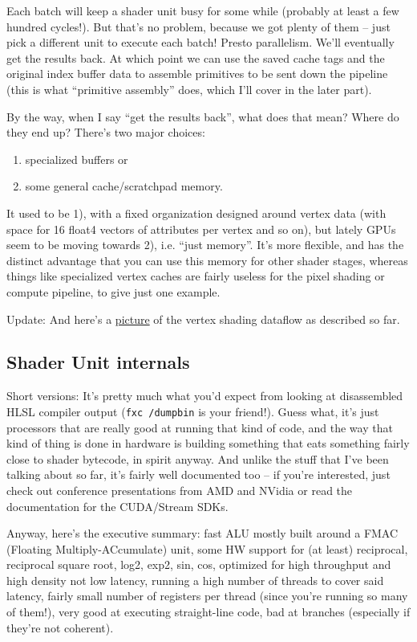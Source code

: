 \documentclass[12pt]{article}
\begin{document}
Each batch will keep a shader unit busy for some while (probably at least a few hundred cycles!).
But that’s no problem, because we got plenty of them – just pick a different unit to execute each batch! Presto parallelism.
We’ll eventually get the results back.
At which point we can use the saved cache tags and the original index buffer data to assemble primitives to be sent down the pipeline (this is what “primitive assembly” does, which I’ll cover in the later part).

By the way, when I say “get the results back”, what does that mean? Where do they end up? There’s two major choices:

\begin{enumerate}
\item specialized buffers or
\item some general cache/scratchpad memory.
\end{enumerate}

It used to be 1), with a fixed organization designed around vertex data (with space for 16 float4 vectors of attributes per vertex and so on), but lately GPUs seem to be moving towards 2), i.e. “just memory”.
It’s more flexible, and has the distinct advantage that you can use this memory for other shader stages, whereas things like specialized vertex caches are fairly useless for the pixel shading or compute pipeline, to give just one example.

Update: And here’s a \href{http://www.farbrausch.de/\~fg/gpu/vertex\_shade.jpg}{picture} of the vertex shading dataflow as described so far.

\subsection{Shader Unit internals}
\label{sec:orgef1e7af}

Short versions: It’s pretty much what you’d expect from looking at disassembled HLSL compiler output (\texttt{fxc /dumpbin} is your friend!).
Guess what, it’s just processors that are really good at running that kind of code, and the way that kind of thing is done in hardware is building something that eats something fairly close to shader bytecode, in spirit anyway.
And unlike the stuff that I’ve been talking about so far, it’s fairly well documented too – if you’re interested, just check out conference presentations from AMD and NVidia or read the documentation for the CUDA/Stream SDKs.

Anyway, here’s the executive summary: fast ALU mostly built around a FMAC (Floating Multiply-ACcumulate) unit, some HW support for (at least) reciprocal, reciprocal square root, log2, exp2, sin, cos, optimized for high throughput and high density not low latency, running a high number of threads to cover said latency, fairly small number of registers per thread (since you’re running so many of them!), very good at executing straight-line code, bad at branches (especially if they’re not coherent).
\end{document}
